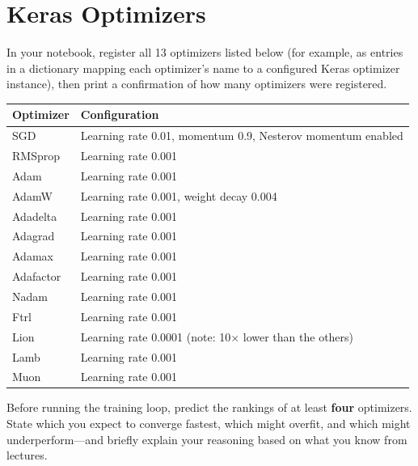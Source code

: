 \documentclass[12pt,a4paper]{article}
\begin{document}
\section{Keras Optimizers}

In your notebook, register all 13 optimizers listed below (for example, as entries in
a dictionary mapping each optimizer's name to a configured Keras optimizer instance),
then print a confirmation of how many optimizers were registered.

\begin{center}
\renewcommand{\arraystretch}{1.3}
\begin{tabularx}{\textwidth}{|l|X|}
\hline
\textbf{Optimizer} & \textbf{Configuration} \\
\hline
SGD & Learning rate 0.01, momentum 0.9, Nesterov momentum enabled \\
\hline
RMSprop & Learning rate 0.001 \\
\hline
Adam & Learning rate 0.001 \\
\hline
AdamW & Learning rate 0.001, weight decay 0.004 \\
\hline
Adadelta & Learning rate 0.001 \\
\hline
Adagrad & Learning rate 0.001 \\
\hline
Adamax & Learning rate 0.001 \\
\hline
Adafactor & Learning rate 0.001 \\
\hline
Nadam & Learning rate 0.001 \\
\hline
Ftrl & Learning rate 0.001 \\
\hline
Lion & Learning rate 0.0001 (note: 10$\times$ lower than the others) \\
\hline
Lamb & Learning rate 0.001 \\
\hline
Muon & Learning rate 0.001 \\
\hline
\end{tabularx}
\end{center}

\begin{tcolorbox}[colback=lightblue!40, colframe=myColorB, title={\textbf{4.1 — Pre-training Prediction}}, fonttitle=\small\bfseries, breakable]
Before running the training loop, predict the rankings of at least \textbf{four} optimizers.
State which you expect to converge fastest, which might overfit, and which might underperform—and
briefly explain your reasoning based on what you know from lectures.
\end{tcolorbox}
\end{document}
